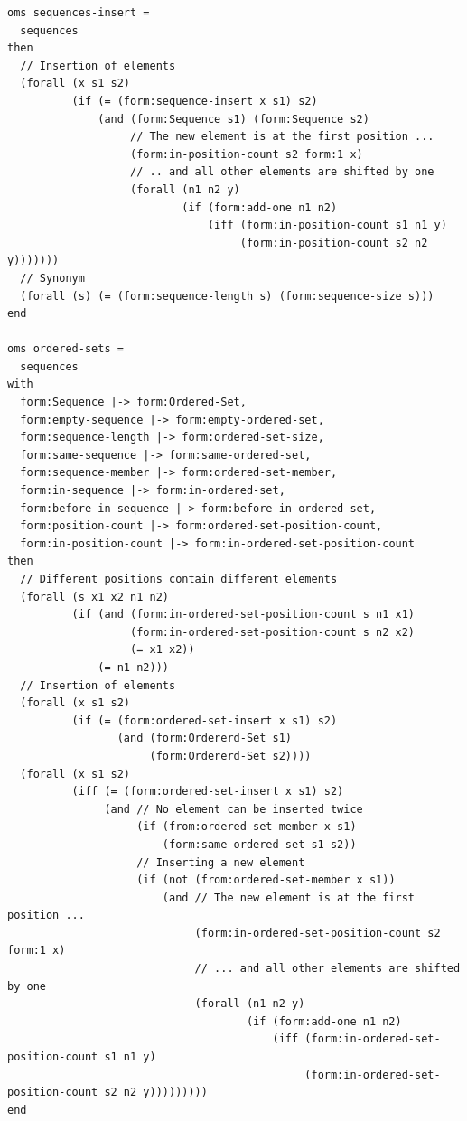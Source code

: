 \documentclass[10pt, a4paper]{isov2}
\begin{document}
\begin{lstlisting}
oms sequences-insert =
  sequences
then
  // Insertion of elements
  (forall (x s1 s2)
          (if (= (form:sequence-insert x s1) s2)
              (and (form:Sequence s1) (form:Sequence s2)
                   // The new element is at the first position ...
                   (form:in-position-count s2 form:1 x)
                   // .. and all other elements are shifted by one
                   (forall (n1 n2 y)
                           (if (form:add-one n1 n2)
                               (iff (form:in-position-count s1 n1 y)
                                    (form:in-position-count s2 n2 y)))))))
  // Synonym
  (forall (s) (= (form:sequence-length s) (form:sequence-size s)))
end

oms ordered-sets =
  sequences
with
  form:Sequence |-> form:Ordered-Set,
  form:empty-sequence |-> form:empty-ordered-set,
  form:sequence-length |-> form:ordered-set-size,
  form:same-sequence |-> form:same-ordered-set,
  form:sequence-member |-> form:ordered-set-member,
  form:in-sequence |-> form:in-ordered-set,
  form:before-in-sequence |-> form:before-in-ordered-set,
  form:position-count |-> form:ordered-set-position-count,
  form:in-position-count |-> form:in-ordered-set-position-count
then
  // Different positions contain different elements
  (forall (s x1 x2 n1 n2)
          (if (and (form:in-ordered-set-position-count s n1 x1)
                   (form:in-ordered-set-position-count s n2 x2)
                   (= x1 x2))
              (= n1 n2)))
  // Insertion of elements
  (forall (x s1 s2)
          (if (= (form:ordered-set-insert x s1) s2)
                 (and (form:Ordererd-Set s1)
                      (form:Ordererd-Set s2))))
  (forall (x s1 s2)
          (iff (= (form:ordered-set-insert x s1) s2)
               (and // No element can be inserted twice
                    (if (from:ordered-set-member x s1)
                        (form:same-ordered-set s1 s2))
                    // Inserting a new element
                    (if (not (from:ordered-set-member x s1))
                        (and // The new element is at the first position ...
                             (form:in-ordered-set-position-count s2 form:1 x)
                             // ... and all other elements are shifted by one
                             (forall (n1 n2 y)
                                     (if (form:add-one n1 n2)
                                         (iff (form:in-ordered-set-position-count s1 n1 y)
                                              (form:in-ordered-set-position-count s2 n2 y)))))))))
end


\end{lstlisting}
\end{document}

